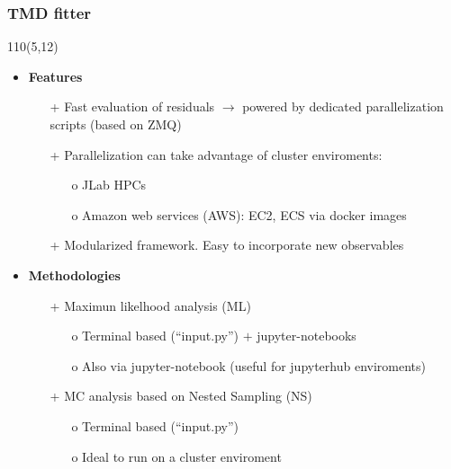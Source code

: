 \begin{frame}
\frametitle{\textbf{TMD fitter }}
\begin{textblock}{110}(5,12) 
\begin{itemize}
\item \textbf{Features}
  \begin{itemize}

  \item[+] Fast evaluation of residuals $\to$ powered by dedicated 
           parallelization scripts (based on ZMQ) 

  \item[+] Parallelization can take advantage of cluster enviroments:

           \begin{itemize}
           \item[o] JLab HPCs
           \item[o] Amazon web services (AWS):  EC2, ECS  via docker
                    images
           \end{itemize}

  \item[+] Modularized framework. Easy to incorporate new observables


  \end{itemize}

\item \textbf{Methodologies}

  \begin{itemize}

  \item[+] Maximun likelhood analysis (ML)

           \begin{itemize}
           \item[o] Terminal based (``input.py'') $+$ jupyter-notebooks 
           \item[o] Also via jupyter-notebook (useful for jupyterhub
                    enviroments)
           \end{itemize}

  \item[+] MC analysis based on Nested Sampling (NS)
           \begin{itemize}
           \item[o] Terminal based (``input.py'')
           \item[o] Ideal to run on a cluster enviroment
           \end{itemize}

  \end{itemize}
 
\end{itemize}
\end{textblock}
\end{frame}


